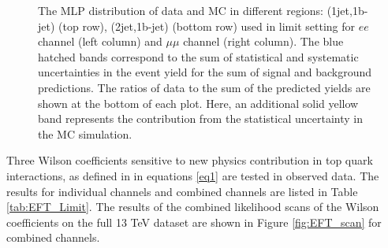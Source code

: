 \begin{figure}[ht]
\begin{center}
\begin{tabular}{ccc}
    \end{tabular}
    \caption{The MLP distribution of data and MC in different regions: (1jet,1b-jet) (top row), (2jet,1b-jet) (bottom row) used in limit setting for $ee$ channel (left column) and $\mu\mu$ channel (right column). The blue hatched bands correspond to the sum of statistical and systematic uncertainties in the event yield for the sum of signal and background predictions. The ratios of data to the sum of the predicted yields are shown at the bottom of each plot. Here, an additional solid yellow band represents the contribution from the statistical uncertainty in the MC simulation.
    \label{fig:limit_binee}}
  \end{center}
\end{figure}


Three Wilson coefficients sensitive to new physics contribution in top quark interactions, as defined in in equations \ref{eq1} are tested in observed data.
The results for individual channels and combined channels are listed in Table \ref{tab:EFT_Limit}.
The results of the combined likelihood scans of the Wilson coefficients on the full 13 TeV dataset are shown in Figure \ref{fig:EFT_scan} for  combined channels.



